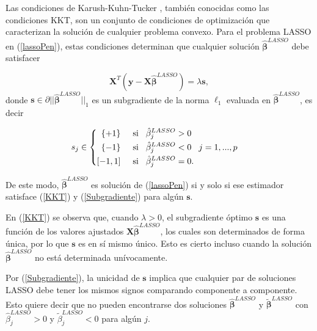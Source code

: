 \documentclass[a4paper,12pt]{report}
\begin{document}
Las condiciones de Karush-Kuhn-Tucker \citep{wu2007karush}, también conocidas como las condiciones KKT, son un conjunto de condiciones de optimización que caracterizan la solución de cualquier problema convexo. Para el problema LASSO en (\ref{lassoPen}), estas condiciones determinan que cualquier solución $\boldsymbol{\hat{\beta}}^{LASSO}$ debe satisfacer

\begin{equation}
\label{KKT}
\boldsymbol{X}^T(\boldsymbol{y}-\boldsymbol{X}\boldsymbol{\hat{\beta}}^{LASSO})=\lambda \boldsymbol{s},
\end{equation}
donde $\boldsymbol{s} \in \partial||\boldsymbol{\hat{\beta}}^{LASSO}||_1$ es un subgradiente de la norma $\ell_1$ evaluada en $\boldsymbol{\hat{\beta}}^{LASSO}$, es decir

{
\begin{equation}
\label{Subgradiente}
s_j \in \begin{cases}
		\begin{aligned}
			\{+1\} \hspace{0.5cm} & \text{si} \hspace{0.3cm} \hat{\beta}_j^{LASSO}>0\\
			\{-1\} \hspace{0.5cm} & \text{si} \hspace{0.3cm} \hat{\beta}_j^{LASSO}<0 \hspace{0.3cm} j=1, ..., p\\
			[-1,1] \hspace{0.5cm} & \text{si} \hspace{0.3cm} \hat{\beta}_j^{LASSO}=0.
		\end{aligned}
        \end{cases}
\end{equation}
}

De este modo, $\boldsymbol{\hat{\beta}}^{LASSO}$ es solución de (\ref{lassoPen}) si y solo si ese estimador satisface (\ref{KKT}) y (\ref{Subgradiente}) para algún $\boldsymbol{s}$.

En (\ref{KKT}) se observa que, cuando $\lambda > 0$, el subgradiente óptimo $\boldsymbol{s}$ es una función de los valores ajustados $\boldsymbol{X}\boldsymbol{\hat{\beta}}^{LASSO}$, los cuales son determinados de forma única, por lo que $\boldsymbol{s}$ es en sí mismo único. Esto es cierto incluso cuando la solución $\boldsymbol{\hat{\beta}}^{LASSO}$ no está determinada unívocamente.

Por (\ref{Subgradiente}), la unicidad de $\boldsymbol{s}$ implica que cualquier par de soluciones LASSO debe tener los mismos signos comparando componente a componente. Esto quiere decir que no pueden encontrarse dos soluciones $\boldsymbol{\hat{\beta}}^{LASSO}$ y $\boldsymbol{\tilde{\beta}}^{LASSO}$ con $\hat{\beta}_j^{LASSO} > 0$ y $\tilde{\beta}_j^{LASSO} < 0$ para algún $j$.
\end{document}
